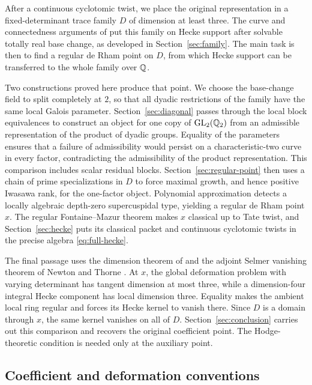 After a continuous cyclotomic twist, we place the original
representation in a fixed-determinant trace family $D$ of dimension
at least three. The curve and connectedness arguments of \cite{FM2}
put this family on Hecke support after solvable totally real base
change, as developed in Section~\ref{sec:family}. The main task is
then to find a regular de Rham point on $D$, from which Hecke
support can be transferred to the whole family over $\mathbb Q$.

Two constructions proved here produce that point. We choose the
base-change field to split completely at $2$, so that all dyadic
restrictions of the family have the same local Galois parameter.
Section~\ref{sec:diagonal} passes through the local block equivalences
to construct an object for one copy of $\operatorname{GL}_2(\mathbb Q_2)$ from an admissible
representation of the product of dyadic groups. Equality of the parameters
ensures that a failure of
admissibility would persist on a characteristic-two curve in every factor,
contradicting the admissibility of the product representation.
This comparison includes scalar residual blocks.
Section~\ref{sec:regular-point} then uses a chain of prime
specializations in $D$ to force maximal growth, and hence positive
Iwasawa rank, for the one-factor object. Polynomial approximation
detects a locally algebraic depth-zero supercuspidal type, yielding
a regular de Rham point $x$. The regular Fontaine--Mazur theorem
\cite[Theorem~1.1]{FM2} makes $x$ classical up to Tate twist, and
Section~\ref{sec:hecke} puts its classical packet and continuous
cyclotomic twists in the precise algebra \eqref{eq:full-hecke}.

The final passage uses the dimension theorem of
\cite[Theorem~1.1]{Dim} and the adjoint Selmer vanishing theorem of
Newton and Thorne \cite[Theorem~5.4]{NewtonThorne2023}.
At $x$, the global deformation problem with varying determinant has
tangent dimension at most three, while a dimension-four integral
Hecke component has local dimension three. Equality makes the
ambient local ring regular and forces its Hecke kernel to vanish
there. Since $D$ is a domain through $x$, the same kernel vanishes
on all of $D$. Section~\ref{sec:conclusion} carries out this comparison
and recovers the original coefficient point. The Hodge-theoretic
condition is needed only at the auxiliary point.

\subsection*{Coefficient and deformation conventions}

